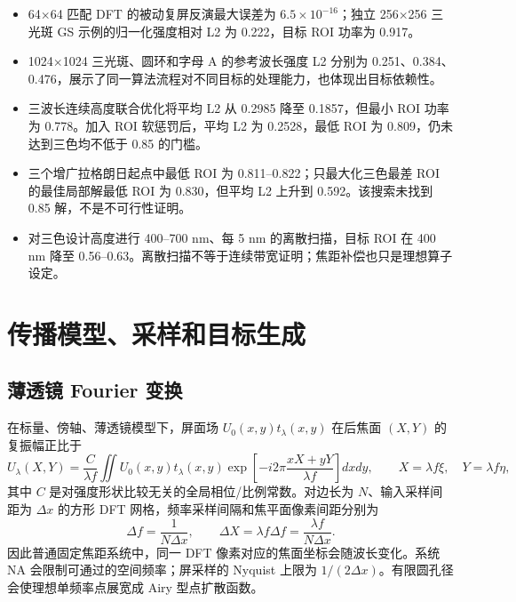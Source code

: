 \documentclass[UTF8,a4paper,11pt,fontset=fandol]{ctexart}
\begin{document}
\begin{itemize}
  \item 64$\times$64 匹配 DFT 的被动复屏反演最大误差为 $6.5\times10^{-16}$；独立 256$\times$256 三光斑 GS 示例的归一化强度相对 L2 为 0.222，目标 ROI 功率为 0.917。
  \item 1024$\times$1024 三光斑、圆环和字母 A 的参考波长强度 L2 分别为 0.251、0.384、0.476，展示了同一算法流程对不同目标的处理能力，也体现出目标依赖性。
  \item 三波长连续高度联合优化将平均 L2 从 0.2985 降至 0.1857，但最小 ROI 功率为 0.778。加入 ROI 软惩罚后，平均 L2 为 0.2528，最低 ROI 为 0.809，仍未达到三色均不低于 0.85 的门槛。
  \item 三个增广拉格朗日起点中最低 ROI 为 0.811--0.822；只最大化三色最差 ROI 的最佳局部解最低 ROI 为 0.830，但平均 L2 上升到 0.592。该搜索未找到 0.85 解，不是不可行性证明。
  \item 对三色设计高度进行 400--700 nm、每 5 nm 的离散扫描，目标 ROI 在 400 nm 降至 0.56--0.63。离散扫描不等于连续带宽证明；焦距补偿也只是理想算子设定。
\end{itemize}

\section{传播模型、采样和目标生成}

\subsection{薄透镜 Fourier 变换}

在标量、傍轴、薄透镜模型下，屏面场 $U_0(x,y)t_\lambda(x,y)$ 在后焦面 $(X,Y)$ 的复振幅正比于
\begin{equation}
U_\lambda(X,Y)=\frac{C}{\lambda f}\iint U_0(x,y)t_\lambda(x,y)
\exp\!\left[-i2\pi\frac{xX+yY}{\lambda f}\right]dxdy,
\qquad X=\lambda f\xi,\quad Y=\lambda f\eta,
\label{eq:fourier}
\end{equation}
其中 $C$ 是对强度形状比较无关的全局相位/比例常数。对边长为 $N$、输入采样间距为 $\Delta x$ 的方形 DFT 网格，频率采样间隔和焦平面像素间距分别为
\begin{equation}
\Delta f=\frac{1}{N\Delta x},\qquad
\Delta X=\lambda f\Delta f=\frac{\lambda f}{N\Delta x}.
\label{eq:sampling}
\end{equation}
因此普通固定焦距系统中，同一 DFT 像素对应的焦面坐标会随波长变化。系统 NA 会限制可通过的空间频率；屏采样的 Nyquist 上限为 $1/(2\Delta x)$。有限圆孔径会使理想单频率点展宽成 Airy 型点扩散函数。
\end{document}
